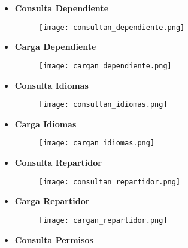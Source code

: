 \documentclass[a4paper]{article}
\begin{document}
\begin{itemize}

    \item \textbf{\large{Consulta Dependiente}}
    
    \begin{figure}[H]
        \centering
        \texttt{[image: consultan\_dependiente.png]}
        \label{fig:consultan_dependiente}
    \end{figure}

    \item \textbf{\large{Carga Dependiente}}
    
    \begin{figure}[H]
        \centering
        \texttt{[image: cargan\_dependiente.png]}
        \label{fig:cargan_dependiente}
    \end{figure}

    \item \textbf{\large{Consulta Idiomas}}
    
    \begin{figure}[H]
        \centering
        \texttt{[image: consultan\_idiomas.png]}
        \label{fig:consultan_idiomas}
    \end{figure}
    
    \item \textbf{\large{Carga Idiomas}}
    
    \begin{figure}[H]
        \centering
        \texttt{[image: cargan\_idiomas.png]}
        \label{fig:cargan_idiomas}
    \end{figure}

    \item \textbf{\large{Consulta Repartidor}}

    \begin{figure}[H]
        \centering
        \texttt{[image: consultan\_repartidor.png]}
        \label{fig:consultan_repartidor}
    \end{figure}

    \item \textbf{\large{Carga Repartidor}}

    \begin{figure}[H]
        \centering
        \texttt{[image: cargan\_repartidor.png]}
        \label{fig:cargan_repartidor}
    \end{figure}

    \item \textbf{\large{Consulta Permisos}}


\end{itemize}
\end{document}
